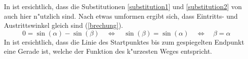 In  ist ersichtlich, dass die Substitutionen
\ref{substitution1} und \ref{substitution2} von 
auch hier n"utzlich sind.
Nach etwas umformen ergibt sich, dass Eintritts- und Austrittswinkel
gleich sind (\eqref{brechung}).
\begin{equation}
0 = \sin(\alpha) - \sin(\beta) \quad \Leftrightarrow \quad \sin(\beta) = \sin(\alpha) \quad \Leftrightarrow\quad \beta = \alpha
\label{brechung}
\end{equation}
In  ist ersichtlich, dass die Linie des Startpunktes
bis zum 
gespiegelten Endpunkt eine Gerade ist, welche der Funktion des k"urzesten
Weges entspricht.
